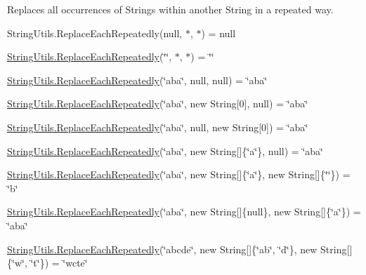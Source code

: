 Replaces all occurrences of Strings within another String in a repeated way. 

String\+Utils.\+Replace\+Each\+Repeatedly(null, $\ast$, $\ast$) = null 

\hyperlink{class_ultimate_1_1_utilities_1_1_string_utils_a84a1fe14cbf3840e1ef64488374dbc49}{String\+Utils.\+Replace\+Each\+Repeatedly}(\char`\"{}\char`\"{}, $\ast$, $\ast$) = \char`\"{}\char`\"{} 

\hyperlink{class_ultimate_1_1_utilities_1_1_string_utils_a84a1fe14cbf3840e1ef64488374dbc49}{String\+Utils.\+Replace\+Each\+Repeatedly}(\char`\"{}aba\char`\"{}, null, null) = \char`\"{}aba\char`\"{} 

\hyperlink{class_ultimate_1_1_utilities_1_1_string_utils_a84a1fe14cbf3840e1ef64488374dbc49}{String\+Utils.\+Replace\+Each\+Repeatedly}(\char`\"{}aba\char`\"{}, new String\mbox{[}0\mbox{]}, null) = \char`\"{}aba\char`\"{} 

\hyperlink{class_ultimate_1_1_utilities_1_1_string_utils_a84a1fe14cbf3840e1ef64488374dbc49}{String\+Utils.\+Replace\+Each\+Repeatedly}(\char`\"{}aba\char`\"{}, null, new String\mbox{[}0\mbox{]}) = \char`\"{}aba\char`\"{} 

\hyperlink{class_ultimate_1_1_utilities_1_1_string_utils_a84a1fe14cbf3840e1ef64488374dbc49}{String\+Utils.\+Replace\+Each\+Repeatedly}(\char`\"{}aba\char`\"{}, new String\mbox{[}\mbox{]}\{\char`\"{}a\char`\"{}\}, null) = \char`\"{}aba\char`\"{} 

\hyperlink{class_ultimate_1_1_utilities_1_1_string_utils_a84a1fe14cbf3840e1ef64488374dbc49}{String\+Utils.\+Replace\+Each\+Repeatedly}(\char`\"{}aba\char`\"{}, new String\mbox{[}\mbox{]}\{\char`\"{}a\char`\"{}\}, new String\mbox{[}\mbox{]}\{\char`\"{}\char`\"{}\}) = \char`\"{}b\char`\"{} 

\hyperlink{class_ultimate_1_1_utilities_1_1_string_utils_a84a1fe14cbf3840e1ef64488374dbc49}{String\+Utils.\+Replace\+Each\+Repeatedly}(\char`\"{}aba\char`\"{}, new String\mbox{[}\mbox{]}\{null\}, new String\mbox{[}\mbox{]}\{\char`\"{}a\char`\"{}\}) = \char`\"{}aba\char`\"{} 

\hyperlink{class_ultimate_1_1_utilities_1_1_string_utils_a84a1fe14cbf3840e1ef64488374dbc49}{String\+Utils.\+Replace\+Each\+Repeatedly}(\char`\"{}abcde\char`\"{}, new String\mbox{[}\mbox{]}\{\char`\"{}ab\char`\"{}, \char`\"{}d\char`\"{}\}, new String\mbox{[}\mbox{]}\{\char`\"{}w\char`\"{}, \char`\"{}t\char`\"{}\}) = \char`\"{}wcte\char`\"{} 



